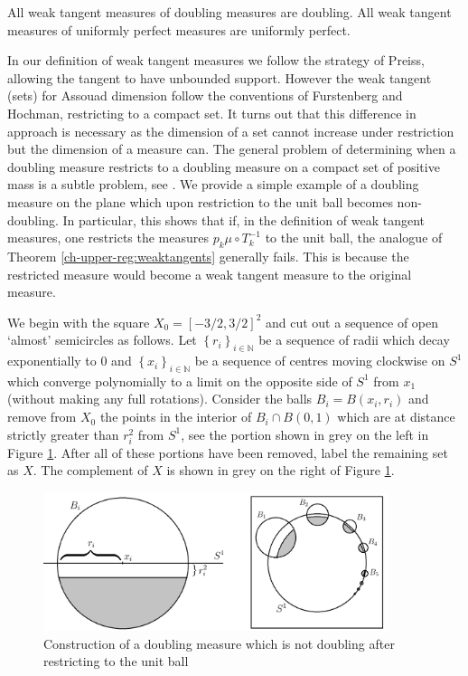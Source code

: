 \begin{corollary}
	All weak tangent measures of doubling measures are doubling. All weak tangent measures of uniformly perfect measures are uniformly perfect.
\end{corollary}



In our definition of weak tangent measures we follow the strategy of Preiss, allowing the tangent to have unbounded support. However the weak tangent (sets) for Assouad dimension follow the conventions of Furstenberg and Hochman, restricting to a compact set. It turns out that this difference in approach is necessary as the dimension of a set cannot increase under restriction but the dimension of a measure can. The general problem of determining when a doubling measure restricts to a doubling measure on a compact set of positive mass is a subtle problem, see \cite{ojala}.  We provide a simple example of a doubling measure on the plane which upon restriction to the unit ball becomes non-doubling.  In particular, this shows that if, in the definition of weak tangent measures, one restricts the measures $p_k \mu \circ T^{-1}_k$ to the unit ball, the analogue of Theorem \ref{ch-upper-reg:weaktangents} generally fails. This is because the restricted measure would become a weak tangent measure to the original measure.

We begin with the square $X_0 = [-3/2, 3/2]^2$ and cut out a sequence of open   `almost' semicircles as follows.   Let $\left\{r_i \right\}_{i\in \mathbb{N}}$ be a sequence of radii which decay exponentially to 0 and $\left\{x_i\right\}_{i\in \mathbb{N}}$ be a sequence of centres moving clockwise on  $S^1$ which converge polynomially to a limit on the opposite side of $S^1$ from $x_1$ (without making any full rotations). Consider the balls $B_i = B(x_i, r_i)$ and remove from $X_0$ the points in the interior of  $B_i \cap B(0,1)$ which are at distance strictly greater than $r_i^2$ from $S^1$, see the portion shown in grey on the left in Figure \ref{ch-upper-reg:example}.  After all of these portions have been removed, label the remaining set as $X$.  The complement of $X$ is shown in grey on the right of Figure \ref{ch-upper-reg:example}. 

\begin{figure}[h]
	\centering
	\includegraphics[width=0.9\textwidth]{pics/ch-upper-reg/example.png}
	\caption{Construction of a doubling measure which is not doubling after restricting to the unit ball}
	\label{ch-upper-reg:example}
\end{figure}

